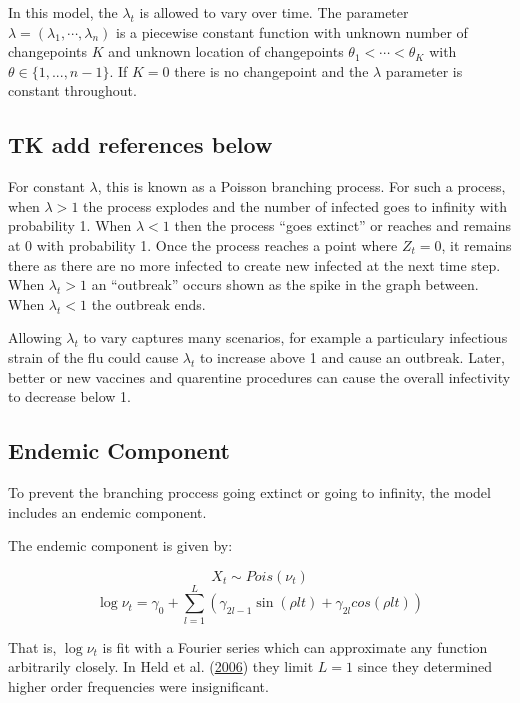 \documentclass[]{article}
\numberwithin{equation}{section}
\begin{document}
In this model, the \(\lambda_t\) is allowed to vary over time. The
parameter \(\lambda = (\lambda_1,\cdots,\lambda_n)\) is a piecewise
constant function with unknown number of changepoints \(K\) and unknown
location of changepoints \(\theta_1 < \cdots < \theta_K\) with
\(\theta \in \{1,...,n-1\}\). If \(K = 0\) there is no changepoint and
the \(\lambda\) parameter is constant throughout.

\hypertarget{tk-add-references-below}{%
\subsection{TK add references below}\label{tk-add-references-below}}

For constant \(\lambda\), this is known as a Poisson branching process.
For such a process, when \(\lambda > 1\) the process explodes and the
number of infected goes to infinity with probability 1. When
\(\lambda < 1\) then the process ``goes extinct'' or reaches and remains
at 0 with probability 1. Once the process reaches a point where
\(Z_t = 0\), it remains there as there are no more infected to create
new infected at the next time step. When \(\lambda_t > 1\) an
``outbreak'' occurs shown as the spike in the graph between. When
\(\lambda_t < 1\) the outbreak ends.

Allowing \(\lambda_t\) to vary captures many scenarios, for example a
particulary infectious strain of the flu could cause \(\lambda_t\) to
increase above 1 and cause an outbreak. Later, better or new vaccines
and quarentine procedures can cause the overall infectivity to decrease
below 1.

\hypertarget{endemic-component}{%
\subsection{Endemic Component}\label{endemic-component}}

To prevent the branching proccess going extinct or going to infinity,
the model includes an endemic component.

The endemic component is given by:

\[X_t \sim Pois(\nu_t)\]
\[\log{\nu_t} = \gamma_0 + \sum_{l = 1}^L (\gamma_{2l-1}\sin(\rho l t)+\gamma_{2l}cos(\rho l t))\]

That is, \(\log{\nu_t}\) is fit with a Fourier series which can
approximate any function arbitrarily closely. In Held et al.
(\protect\hyperlink{ref-held_two-component_2006}{2006}) they limit
\(L = 1\) since they determined higher order frequencies were
insignificant.
\end{document}
